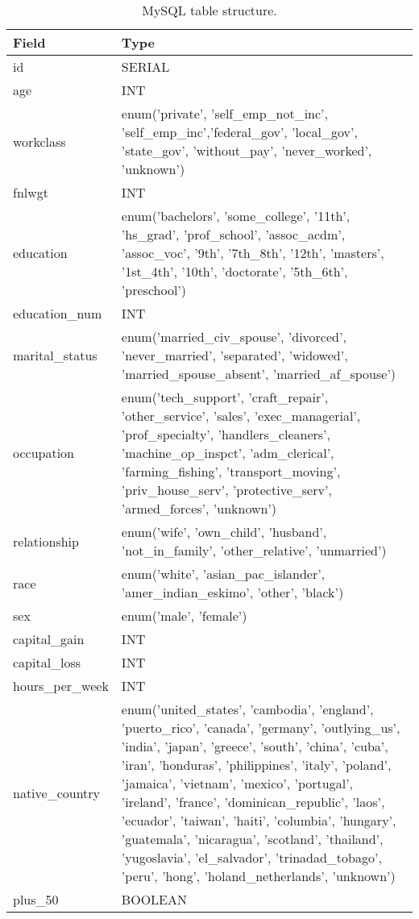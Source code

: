 \documentclass[a4paper]{llncs}
\begin{document}
\begin{table}[ht]
  \begin{tabular}{ | l | p{14cm} |}
    \hline
    \textbf{Field} & \textbf{Type} \\ \hline
    id & SERIAL \\ \hline
    age & INT \\ \hline
    workclass & enum('private', 'self\_emp\_not\_inc', 'self\_emp\_inc','federal\_gov', 'local\_gov', 'state\_gov', 'without\_pay', 'never\_worked', 'unknown') \\ \hline
    fnlwgt & INT \\ \hline
    education & enum('bachelors', 'some\_college', '11th', 'hs\_grad', 'prof\_school', 'assoc\_acdm', 'assoc\_voc', '9th', '7th\_8th', '12th', 'masters', '1st\_4th', '10th', 'doctorate', '5th\_6th', 'preschool') \\ \hline
    education\_num & INT \\ \hline
    marital\_status & enum('married\_civ\_spouse', 'divorced', 'never\_married', 'separated', 'widowed', 'married\_spouse\_absent', 'married\_af\_spouse') \\ \hline
    occupation & enum('tech\_support', 'craft\_repair', 'other\_service', 'sales', 'exec\_managerial', 'prof\_specialty', 'handlers\_cleaners', 'machine\_op\_inspct', 'adm\_clerical', 'farming\_fishing', 'transport\_moving', 'priv\_house\_serv', 'protective\_serv', 'armed\_forces', 'unknown') \\ \hline
    relationship & enum('wife', 'own\_child', 'husband', 'not\_in\_family', 'other\_relative', 'unmarried') \\ \hline
    race & enum('white', 'asian\_pac\_islander', 'amer\_indian\_eskimo', 'other', 'black') \\ \hline
    sex & enum('male', 'female') \\ \hline
    capital\_gain & INT \\ \hline
    capital\_loss & INT \\ \hline
    hours\_per\_week & INT \\ \hline
    native\_country & enum('united\_states', 'cambodia', 'england', 'puerto\_rico', 'canada', 'germany', 'outlying\_us', 'india', 'japan', 'greece', 'south', 'china', 'cuba', 'iran', 'honduras', 'philippines', 'italy', 'poland', 'jamaica', 'vietnam', 'mexico', 'portugal', 'ireland', 'france', 'dominican\_republic', 'laos', 'ecuador', 'taiwan', 'haiti', 'columbia', 'hungary', 'guatemala', 'nicaragua', 'scotland', 'thailand', 'yugoslavia', 'el\_salvador', 'trinadad\_tobago', 'peru', 'hong', 'holand\_netherlands', 'unknown') \\ \hline
    plus\_50 & BOOLEAN \\ \hline
  \end{tabular}
  \caption{MySQL table structure.}
  \label{tbl:mysql_table}
\end{table}
\end{document}
